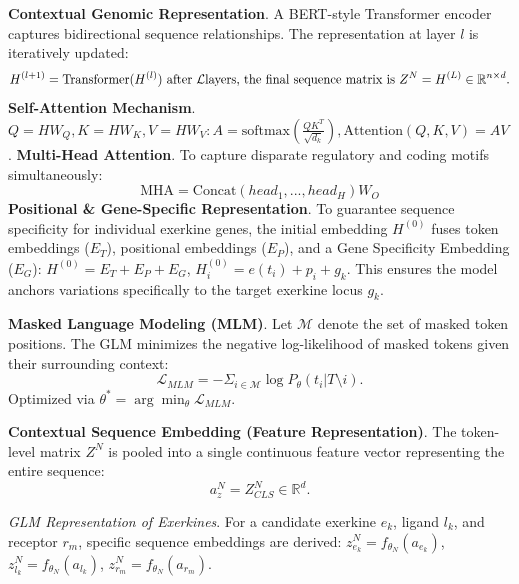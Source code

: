 \documentclass[11pt]{article}
\begin{document}
\textbf{Contextual Genomic Representation}. A BERT-style Transformer encoder captures bidirectional sequence relationships. The representation at layer $l$ is iteratively updated: \newline 
\begin{equation}
H^{(l+1)} = \text{Transformer}(H^{(l)}) \text{ after } \mathcal{L} \text{layers, the final sequence matrix is } Z^N = H^{(L)} \in \mathbb{R}^{n\times d}. \newline
\end{equation}
\textbf{Self-Attention Mechanism}.  $Q = HW_Q, K = HW_K, V = HW_V: A = \text{softmax}(\frac{QK^T}{\sqrt{d_k}}), \text{Attention}(Q,K,V) = AV$. \newline 
\textbf{Multi-Head Attention}. To capture disparate regulatory and coding motifs simultaneously: \newline 
\begin{equation}
\text{MHA} = \text{Concat}(head_1,...,head_H)W_O
\end{equation}
\textbf{Positional \& Gene-Specific Representation}. To guarantee sequence specificity for individual exerkine genes, the initial embedding $H^{(0)}$ fuses token embeddings ($E_T$), positional embeddings ($E_P$), and a Gene Specificity Embedding ($E_G$): $H^{(0)}=E_T + E_P + E_G$, $H_i^{(0)}=e(t_i) +p_i + g_k$. This ensures the model anchors variations specifically to the target exerkine locus $g_k$.

\textbf{Masked Language Modeling (MLM)}. Let $\mathcal{M}$ denote the set of masked token positions. The GLM minimizes the negative log-likelihood of masked tokens given their surrounding context: \newline 
\begin{equation}
\mathcal{L}_{MLM}=-\Sigma_{i\in \mathcal{M}} \log P_{\theta} (t_i | T\setminus i).
\end{equation}
Optimized via $\theta^* = \arg\min_{\theta}\mathcal{L}_{MLM}$. 

\textbf{Contextual Sequence Embedding (Feature Representation)}. The token-level matrix $Z^N$ is pooled into a single continuous feature vector representing the entire sequence: \newline
\begin{equation}
a_z^N = Z_{CLS}^N \in \mathbb{R}^d.   
\end{equation}

\textit{GLM Representation of Exerkines}. For a candidate exerkine $e_k$, ligand $l_k$, and receptor $r_m$, specific sequence embeddings are derived: $z_{e_k}^N = f_{\theta_N} (a_{e_k})$, $z_{l_k}^N = f_{\theta_N}(a_{l_k})$, $z_{r_m}^N = f_{\theta_N}(a_{r_m})$.
\end{document}
